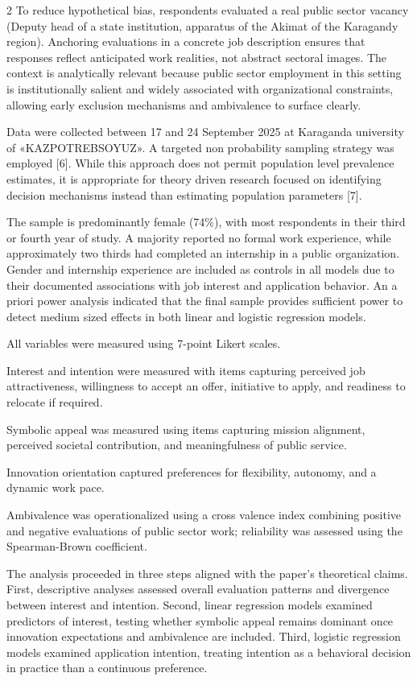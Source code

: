 \begin{multicols}{2}
To reduce hypothetical bias, respondents evaluated a real public sector
vacancy (Deputy head of a state institution, apparatus of the Akimat of
the Karagandy region). Anchoring evaluations in a concrete job
description ensures that responses reflect anticipated work realities,
not abstract sectoral images. The context is analytically relevant
because public sector employment in this setting is institutionally
salient and widely associated with organizational constraints, allowing
early exclusion mechanisms and ambivalence to surface clearly.

Data were collected between 17 and 24 September 2025 at Karaganda
university of «KAZPOTREBSOYUZ». A targeted non probability sampling
strategy was employed {[}6{]}. While this approach does not permit
population level prevalence estimates, it is appropriate for theory
driven research focused on identifying decision mechanisms instead than
estimating population parameters {[}7{]}.

The sample is predominantly female (74\%), with most respondents in
their third or fourth year of study. A majority reported no formal work
experience, while approximately two thirds had completed an internship
in a public organization. Gender and internship experience are included
as controls in all models due to their documented associations with job
interest and application behavior. An a priori power analysis indicated
that the final sample provides sufficient power to detect medium sized
effects in both linear and logistic regression models.

All variables were measured using 7-point Likert scales.

Interest and intention were measured with items capturing perceived job
attractiveness, willingness to accept an offer, initiative to apply, and
readiness to relocate if required.

Symbolic appeal was measured using items capturing mission alignment,
perceived societal contribution, and meaningfulness of public service.

Innovation orientation captured preferences for flexibility, autonomy,
and a dynamic work pace.

Ambivalence was operationalized using a cross valence index combining
positive and negative evaluations of public sector work; reliability was
assessed using the Spearman-Brown coefficient.

The analysis proceeded in three steps aligned with the paper's
theoretical claims. First, descriptive analyses assessed overall
evaluation patterns and divergence between interest and intention.
Second, linear regression models examined predictors of interest,
testing whether symbolic appeal remains dominant once innovation
expectations and ambivalence are included. Third, logistic regression
models examined application intention, treating intention as a
behavioral decision in practice than a continuous preference.


\end{multicols}
